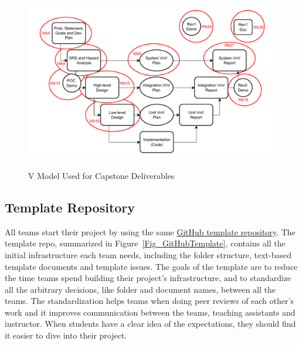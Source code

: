 \documentclass[10pt, conference]{IEEEtran}
\begin{document}
\begin{figure}[h!]
  \hspace{-0.6cm}
    {
      \includegraphics[width=1.1\columnwidth]{./figures/CourseStructure.drawio.pdf}
    }
    \caption{\label{Fig_VModel} V Model Used for Capstone Deliverables}
\end{figure}
\subsection{Template Repository}

All teams start their project by using the same
\href{REDACTED Link} {GitHub template repository}. The template repo, summarized
in Figure~\ref{Fig_GitHubTemplate}, contains all the initial infrastructure each
team needs, including the folder structure, text-based template documents and
template issues. The goals of the template are to reduce the time teams spend
building their project's infrastructure, and to standardize all the arbitrary
decisions, like folder and document names, between all the teams. The
standardization helps teams when doing peer reviews of each other's work and it
improves communication between the teams, teaching assistants and instructor.
When students have a clear idea of the expectations, they should find it easier
to dive into their project.
\end{document}

